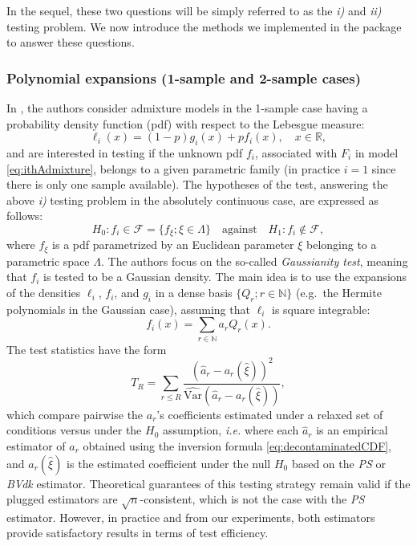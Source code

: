 In the sequel, these two questions will be simply referred to as the \emph{i)} and \emph{ii)} testing problem. We now introduce the methods we implemented in the  package to answer these questions.

\subsubsection{Polynomial expansions (1-sample and 2-sample cases)}\label{polynomial-expansions-1-sample-and-2-sample-cases}

In \citet{Pommeret+Vandekerkhove:2019}, the authors consider admixture models in the 1-sample case having a probability density function (pdf) with respect to the Lebesgue measure:
\begin{equation}
  \ell_i(x) = (1-p) g_i(x) + p f_i(x),\quad x\in \mathbb{R},
\label{eq:admixDensite}
\end{equation}
and are interested in testing if the unknown pdf \(f_i\), associated with \(F_i\) in model \eqref{eq:ithAdmixture}, belongs to a given parametric family (in practice \(i=1\) since there is only one sample available). The hypotheses of the test, answering the above \emph{i)} testing problem in the absolutely continuous case, are expressed as follows:
\begin{equation}
  H_0 : f_i \in {\mathcal F} = \{ f_{\xi} ;  \xi \in \Lambda \} \quad \text{against} \quad H_1 : f_i \notin {\mathcal F},
\label{eq:Hsimple}
\end{equation}
where \(f_{\xi}\) is a pdf parametrized by an Euclidean parameter \(\xi\) belonging to a parametric space \(\Lambda\). The authors focus on the so-called \emph{Gaussianity test}, meaning that \(f_i\) is tested to be a Gaussian density.
The main idea is to use the expansions of the densities \(\ell_i\), \(f_i\), and \(g_i\) in a dense basis \(\{ Q_r ; r \in \mathbb N \}\) (e.g.~the Hermite polynomials in the Gaussian case), assuming that \(\ell_i\) is square integrable:
\begin{equation}
  f_i(x) =  \displaystyle\sum_{r\in\mathbb N} a_r Q_r(x).
\label{eq:ortho-admixtureDensity}
\end{equation}
The test statistics have the form
\[
  T_{R} = \sum_{r \leq R} \frac{(\widehat a_r - a_r(\widehat \xi))^2}{\widehat{\mathrm{Var}}(\widehat a_r - a_r(\widehat \xi))},
\]
which compare pairwise the \(a_r\)'s coefficients estimated under a relaxed set of conditions versus under the \(H_0\) assumption, \emph{i.e.} where each \(\widehat a_r\) is an empirical estimator of \(a_r\) obtained using the inversion formula \eqref{eq:decontaminatedCDF}, and \(a_r(\widehat \xi)\) is the estimated coefficient under the null \(H_0\) based on the \emph{PS} or \emph{BVdk} estimator.
Theoretical guarantees of this testing strategy remain valid if the plugged estimators are \(\sqrt{n}\)-consistent, which is not the case with the \emph{PS} estimator. However, in practice and from our experiments, both estimators provide satisfactory results in terms of test efficiency.

